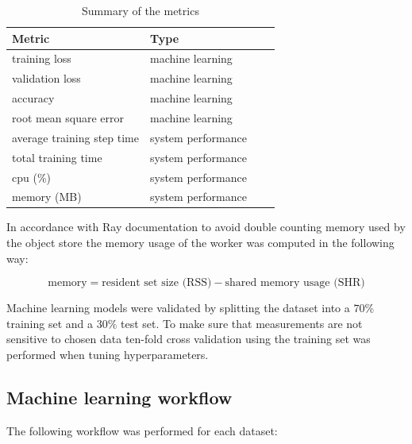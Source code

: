 \begin{table}[h]
    \centering
    \begin{tabular}{llll}
        \toprule
        Metric                     & Type               \\
        \midrule
        training loss              & machine learning   \\
        validation loss            & machine learning   \\
        accuracy                   & machine learning   \\
        root mean square error     & machine learning   \\
        average training step time & system performance \\
        total training time        & system performance \\
        cpu (\%)                   & system performance \\
        memory (MB)                & system performance \\
        \bottomrule
    \end{tabular}
    \caption{Summary of the metrics}
    \label{table:metrics}
\end{table}

In accordance with Ray documentation \parencite{therayteamMemoryManagementRay} to avoid double counting memory used by the object store the memory usage of the worker was computed in the following way:

\[ \text{memory} = \text{resident set size (RSS)} - \text{shared memory usage (SHR)} \]

Machine learning models were validated by splitting the dataset into a $70\%$ training set and a $30\%$ test set. To make sure that measurements are not sensitive to chosen data ten-fold cross validation using the training set was performed when tuning hyperparameters.



\subsection{Machine learning workflow}

The following workflow was performed for each dataset:

